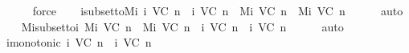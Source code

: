 \begin{isabellebody}
%
\isadelimproof
\ \ \ \ %
\endisadelimproof
%
\isatagproof
{}\isamarkupfalse%
\ force%
\endisatagproof
{\isafoldproof}%
%
\isadelimproof
\isanewline
%
\endisadelimproof
\isanewline
\ \ \isamarkupfalse%
\ {\isasymSigma}i{\isacharunderscore}subset{\isacharunderscore}to{\isacharunderscore}Mi{\isacharcolon}\ {\isachardoublequoteopen}{\isasymSigma}i\ {\isacharparenleft}V{\isacharcomma}C{\isacharcomma}{\isasymepsilon}{\isacharparenright}\ n\ {\isasymsubseteq}\ {\isasymSigma}i\ {\isacharparenleft}V{\isacharcomma}C{\isacharcomma}{\isasymepsilon}{\isacharparenright}\ {\isacharparenleft}n{\isacharplus}{}{\isacharparenright}\ {\isasymLongrightarrow}\ Mi\ {\isacharparenleft}V{\isacharcomma}C{\isacharcomma}{\isasymepsilon}{\isacharparenright}\ n\ {\isasymsubseteq}\ Mi\ {\isacharparenleft}V{\isacharcomma}C{\isacharcomma}{\isasymepsilon}{\isacharparenright}\ {\isacharparenleft}n{\isacharplus}{}{\isacharparenright}{\isachardoublequoteclose}\isanewline
%
\isadelimproof
\ \ \ \ %
\endisadelimproof
%
\isatagproof
{}\isamarkupfalse%
\ auto%
\endisatagproof
{\isafoldproof}%
%
\isadelimproof
\isanewline
%
\endisadelimproof
\isanewline
\ \ \isamarkupfalse%
\ Mi{\isacharunderscore}subset{\isacharunderscore}to{\isacharunderscore}{\isasymSigma}i{\isacharcolon}\ {\isachardoublequoteopen}Mi\ {\isacharparenleft}V{\isacharcomma}C{\isacharcomma}{\isasymepsilon}{\isacharparenright}\ n\ {\isasymsubseteq}\ Mi\ {\isacharparenleft}V{\isacharcomma}C{\isacharcomma}{\isasymepsilon}{\isacharparenright}\ {\isacharparenleft}n{\isacharplus}{}{\isacharparenright}\ {\isasymLongrightarrow}\ {\isasymSigma}i\ {\isacharparenleft}V{\isacharcomma}C{\isacharcomma}{\isasymepsilon}{\isacharparenright}\ {\isacharparenleft}n{\isacharplus}{}{\isacharparenright}\ {\isasymsubseteq}\ {\isasymSigma}i\ {\isacharparenleft}V{\isacharcomma}C{\isacharcomma}{\isasymepsilon}{\isacharparenright}\ {\isacharparenleft}n{\isacharplus}{}{\isacharparenright}{\isachardoublequoteclose}\isanewline
%
\isadelimproof
\ \ \ \ %
\endisadelimproof
%
\isatagproof
{}\isamarkupfalse%
\ auto%
\endisatagproof
{\isafoldproof}%
%
\isadelimproof
\isanewline
%
\endisadelimproof
\isanewline
\ \ \isamarkupfalse%
\ {\isasymSigma}i{\isacharunderscore}monotonic{\isacharcolon}\ {\isachardoublequoteopen}{\isasymSigma}i\ {\isacharparenleft}V{\isacharcomma}C{\isacharcomma}{\isasymepsilon}{\isacharparenright}\ n\ {\isasymsubseteq}\ {\isasymSigma}i\ {\isacharparenleft}V{\isacharcomma}C{\isacharcomma}{\isasymepsilon}{\isacharparenright}\ {\isacharparenleft}n{\isacharplus}{}{\isacharparenright}{\isachardoublequoteclose}\isanewline

\end{isabellebody}
